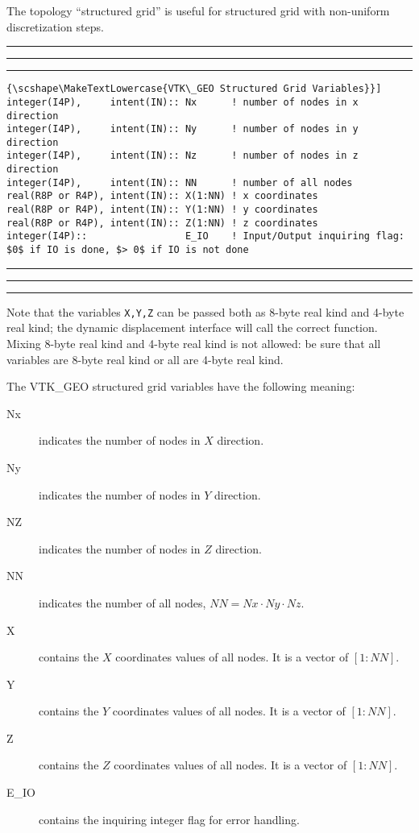 \documentclass[pagesize=pdftex,fontsize=10pt,paper=a4,oneside]{scrbook}
\DeclareRobustCommand{\MarginNote}[1]{\marginpar{%
\slshape\footnotesize%
\parindent=0pt\lineskip=0pt\lineskiplimit=0pt%
\tolerance=2000\hyphenpenalty=300\exhyphenpenalty=300%
\doublehyphendemerits=100000\finalhyphendemerits=\doublehyphendemerits%
\raggedright\hspace{0pt}#1}}
\newenvironment{boxred}[1]%
               {%
                \noindent\hspace*{-0.025\textwidth}%
                \color{Maroon}%
                \rule[-5.8pt]{0.6pt}{6pt}\hspace*{-0.6pt}\rule{1.05\textwidth}{0.6pt}\hspace*{-0.6pt}\rule[-5.8pt]{0.6pt}{6pt}%
                \color{black}%
                \vspace*{0.6pt}\MarginNote{\color{Maroon}{#1}}%
               }%
               {%
                \noindent\hspace*{-0.025\textwidth}%
                \color{Maroon}%
                \rule[0pt]{0.6pt}{6pt}\hspace*{-0.6pt}\rule{1.05\textwidth}{0.6pt}\hspace*{-0.6pt}\rule[0pt]{0.6pt}{6pt}%
                \color{black}%
                \vspace*{2mm}%
               }
\newcommand{\virgo}[1]{``{#1}''}
\DeclareRobustCommand{\MaiuscolettoBS}[1]{\textls[80]{\scshape\MakeTextLowercase{#1}}}
\begin{document}
The topology \virgo{structured grid} is useful for structured grid with non-uniform discretization steps.

\begin{boxred}{}
\begin{lstlisting}[style=variables,title=\color{Maroon}\MaiuscolettoBS{VTK\_GEO Structured Grid Variables}]
integer(I4P),     intent(IN):: Nx      ! number of nodes in x direction
integer(I4P),     intent(IN):: Ny      ! number of nodes in y direction
integer(I4P),     intent(IN):: Nz      ! number of nodes in z direction
integer(I4P),     intent(IN):: NN      ! number of all nodes
real(R8P or R4P), intent(IN):: X(1:NN) ! x coordinates
real(R8P or R4P), intent(IN):: Y(1:NN) ! y coordinates
real(R8P or R4P), intent(IN):: Z(1:NN) ! z coordinates
integer(I4P)::                 E_IO    ! Input/Output inquiring flag: $0$ if IO is done, $> 0$ if IO is not done
\end{lstlisting}
\end{boxred}

Note that the variables \texttt{X,Y,Z} can be passed both as 8-byte real kind and 4-byte real kind; the dynamic
displacement interface will call the correct function. Mixing 8-byte real kind and 4-byte real kind is not allowed: be
sure that all variables are 8-byte real kind or all are 4-byte real kind.

The VTK\_GEO structured grid variables have the following meaning:

\begin{description}
  \item[{\color{RoyalBlue}Nx}] indicates the number of nodes in $X$ direction.
  \item[{\color{RoyalBlue}Ny}] indicates the number of nodes in $Y$ direction.
  \item[{\color{RoyalBlue}NZ}] indicates the number of nodes in $Z$ direction.
  \item[{\color{RoyalBlue}NN}] indicates the number of all nodes, $NN= Nx\cdot Ny\cdot Nz$.
  \item[{\color{RoyalBlue}X}] contains the $X$ coordinates values of all nodes. It is a vector of $[1:NN]$.
  \item[{\color{RoyalBlue}Y}] contains the $Y$ coordinates values of all nodes. It is a vector of $[1:NN]$.
  \item[{\color{RoyalBlue}Z}] contains the $Z$ coordinates values of all nodes. It is a vector of $[1:NN]$.
  \item[{\color{RoyalBlue}E\_IO}] contains the inquiring integer flag for error handling.
\end{description}
\end{document}
